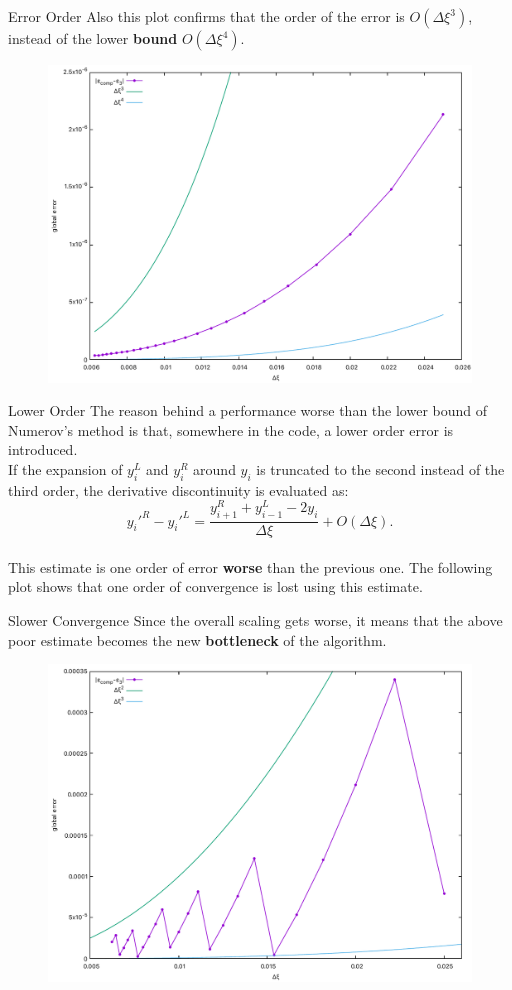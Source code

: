 \documentclass{beamer}
\begin{document}
\begin{frame}{Error Order}
Also this plot confirms that the order of the error is $O(\Delta \xi^3)$, instead of the lower \textbf{bound} $O(\Delta \xi^4)$.
\begin{figure}
\centering
\includegraphics[width=0.75\linewidth]{../gnuplot/image3.pdf}
\end{figure}
\end{frame}

\begin{frame}{Lower Order}
The reason behind a performance worse than the lower bound of Numerov's method is that, somewhere in the code, a lower order error is introduced.\\
\vspace{0.5em}
If the expansion of $y_i^{L}$ and $y_i^{R}$ around $y_i$ is truncated to the second instead of the third order, the derivative discontinuity is evaluated as:\vspace{0.5em}
$$y_i'^R-y_i'^L=\frac{y_{i+1}^R+y_{i-1}^L-2y_i}{\Delta \xi}+O(\Delta \xi).$$
\vspace{0.5em}
\\This estimate is one order of error \textbf{worse} than the previous one. The following plot shows that one order of convergence is lost using this estimate.
\end{frame}

\begin{frame}{Slower Convergence}
Since the overall scaling gets worse, it means that the above poor estimate becomes the new \textbf{bottleneck} of the algorithm.
\begin{figure}
\centering
\includegraphics[width=0.75\linewidth]{../gnuplot/image2.pdf}
\end{figure}
\end{frame}
\end{document}
